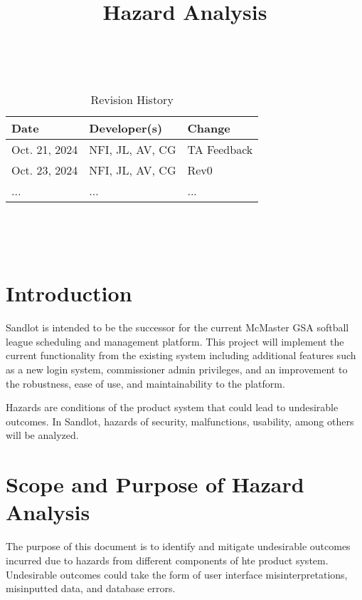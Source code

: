\documentclass{article}
\title{Hazard Analysis\\\progname}
\author{\authname}
\date{}
\begin{document}
\maketitle
\thispagestyle{empty}

~\newpage


\begin{table}[hp]
\caption{Revision History} \label{TblRevisionHistory}
\begin{tabularx}{\textwidth}{llX}
\toprule
\textbf{Date} & \textbf{Developer(s)} & \textbf{Change}\\
\midrule
Oct. 21, 2024 & NFI, JL, AV, CG & TA Feedback\\
Oct. 23, 2024 & NFI, JL, AV, CG & Rev0\\
... & ... & ...\\
\bottomrule
\end{tabularx}
\end{table}

~\newpage

\tableofcontents

~\newpage


\section{Introduction}

Sandlot is intended to be the successor for the current McMaster GSA
softball league scheduling and management platform. This project
will implement the current functionality from the existing system including
additional features such as a new login system, commissioner admin
privileges, and an improvement to the robustness, ease of use, and
maintainability to the platform.

Hazards are conditions of the product system that could lead to undesirable outcomes. 
In Sandlot, hazards of security, malfunctions, usability, among others will be analyzed.

\section{Scope and Purpose of Hazard Analysis}


The purpose of this document is to identify and mitigate undesirable outcomes incurred due to 
hazards from different components of hte product system. Undesirable outcomes could take the form
of user interface misinterpretations, misinputted data, and database errors.  
\end{document}
